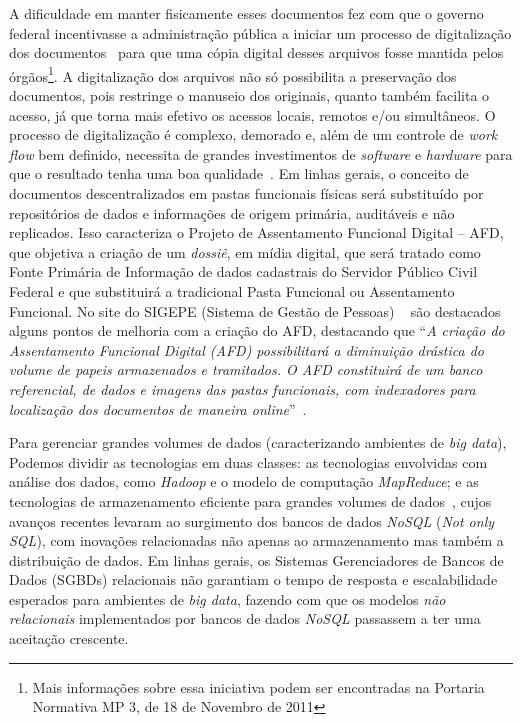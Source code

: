 A dificuldade em manter fisicamente esses documentos fez com que o governo federal incentivasse a administração pública a iniciar um processo de digitalização dos documentos~\cite{portariaMP} para que uma cópia digital desses arquivos fosse mantida pelos órgãos\footnote{Mais informa\c c\~{o}es sobre essa iniciativa podem ser encontradas na Portaria Normativa MP 3, de 18 de Novembro de 2011}. A digitalização dos arquivos não só possibilita a preservação dos documentos, pois restringe o manuseio dos originais, quanto também facilita o acesso, já que torna mais efetivo os acessos locais, remotos e/ou simultâneos. O processo de digitalização é complexo, demorado e, além de um controle de \textit{work flow} bem definido, necessita de grandes investimentos de \textit{software} e \textit{hardware} para que o resultado tenha uma boa qualidade~\cite{arqConarq}. Em linhas gerais, o conceito de documentos descentralizados em pastas funcionais físicas será substituído por repositórios de dados e informações de origem primária, auditáveis e não replicados. Isso caracteriza o Projeto de Assentamento Funcional Digital – AFD, que objetiva a criação de um \emph{dossiê}, em mídia digital, que será tratado como Fonte Primária de Informação de dados cadastrais do Servidor Público Civil Federal e que substituirá a tradicional Pasta Funcional ou Assentamento Funcional. No site do SIGEPE (Sistema de Gestão de Pessoas) ~\cite{siteSIGEPE} são destacados alguns pontos de melhoria com a criação do AFD, destacando que ``\emph{A criação do Assentamento Funcional Digital (AFD) possibilitará a diminuição drástica do volume de papeis armazenados e tramitados. O AFD constituirá de um banco referencial, de dados e imagens das pastas funcionais, com indexadores para localização dos documentos de maneira online}''~\cite{apresentAFD}.


Para gerenciar grandes volumes de dados (caracterizando ambientes de \emph{big data}), Podemos dividir as tecnologias em duas classes: as  tecnologias envolvidas com análise dos dados, como \emph{Hadoop} e o modelo de computa\c c\~{a}o \emph{MapReduce}; e as tecnologias de armazenamento eficiente para grandes volumes de dados~\cite{ibmvcsabeoqebigdata}, cujos avanços recentes levaram ao surgimento dos bancos de dados \emph{NoSQL} (\emph{Not only SQL}), com inovações relacionadas não apenas ao armazenamento mas também a distribuição de dados. Em linhas gerais, os Sistemas Gerenciadores de Bancos de Dados (SGBDs) relacionais não garantiam o tempo de resposta e escalabilidade esperados para ambientes de \emph{big data}, fazendo com que os modelos \emph{não relacionais} implementados por bancos de dados \emph{NoSQL} passassem a ter uma aceitação crescente.
 
